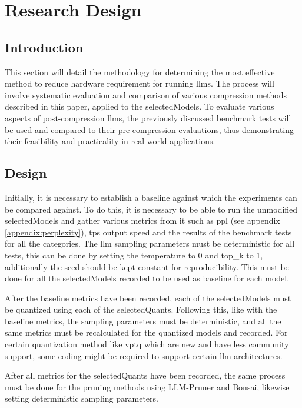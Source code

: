 \documentclass{ifacconf}
\begin{document}
	
	\section{Research Design}
	\subsection{Introduction}
	This section will detail the methodology for determining the most effective method to reduce hardware requirement for running \glspl{llm}. The process will involve systematic evaluation and comparison of various compression methods described in this paper, applied to the \gls{selectedModels}. To evaluate various aspects of post-compression \glspl{llm}, the previously discussed benchmark tests will be used and compared to their pre-compression evaluations, thus demonstrating their feasibility and practicality in real-world applications.
	
	\subsection{Design}
	Initially, it is necessary to establish a baseline against which the experiments can be compared against. To do this, it is necessary to be able to run the unmodified \gls{selectedModels} and gather various metrics from it such as \gls{ppl} (see appendix \ref{appendix:perplexity}), \gls{tps} output speed and the results of the benchmark tests for all the categories. The \gls{llm} sampling parameters must be deterministic for all tests, this can be done by setting the temperature to 0 and top\_k to 1, additionally the seed should be kept constant for reproducibility. This must be done for all the \gls{selectedModels} recorded to be used as baseline for each model.
	
	After the baseline metrics have been recorded, each of the \gls{selectedModels} must be quantized using each of the \gls{selectedQuants}. Following this, like with the baseline metrics, the sampling parameters must be deterministic, and all the same metrics must be recalculated for the quantized models and recorded. For certain quantization method like \gls{vptq} which are new and have less community support, some coding might be required to support certain \gls{llm} architectures.
	
	After all metrics for the \gls{selectedQuants} have been recorded, the same process must be done for the pruning methods using LLM-Pruner and Bonsai, likewise setting deterministic sampling parameters.
	
\end{document}
